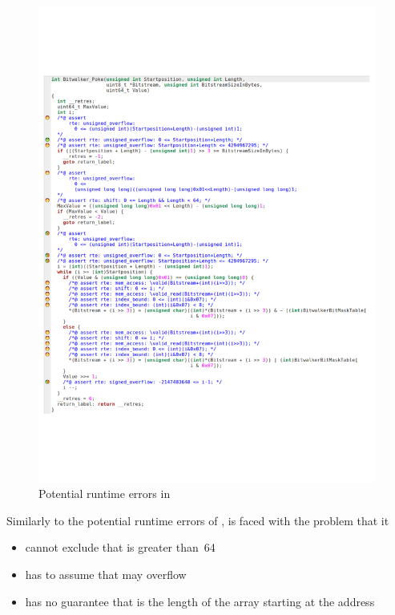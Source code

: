 \begin{figure}[hbt]
\begin{center}
\includegraphics[width=0.99\textwidth]{figures/poke-wp.pdf}
\caption{\label{fig:poke-wp} Potential runtime errors in \peek}
\end{center}
\end{figure}

Similarly to the potential runtime errors of \peek, \framacwp
is faced with the problem that it

\begin{itemize}
\item cannot exclude that  is greater than~64 
\item has to assume that  may overflow
\item has no guarantee that  is the length 
      of the array starting at the address 
\end{itemize}

